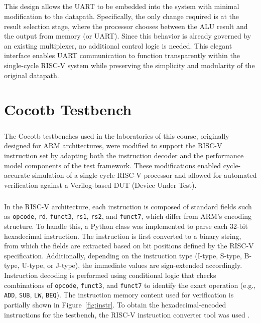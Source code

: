 \documentclass[12pt]{report}
\begin{document}
\paragraph{}
This design allows the UART to be embedded into the system with minimal modification to the datapath. Specifically, the only change required is at the result selection stage, where the processor chooses between the ALU result and the output from memory (or UART). Since this behavior is already governed by an existing multiplexer, no additional control logic is needed. This elegant interface enables UART communication to function transparently within the single-cycle RISC-V system while preserving the simplicity and modularity of the original datapath.


\chapter{Cocotb Testbench}
\paragraph{}
The Cocotb testbenches used in the laboratories of this course, originally designed for ARM architectures, were modified to support the RISC-V instruction set by adapting both the instruction decoder and the performance model components of the test framework. These modifications enabled cycle-accurate simulation of a single-cycle RISC-V processor and allowed for automated verification against a Verilog-based DUT (Device Under Test).

\paragraph{}
In the RISC-V architecture, each instruction is composed of standard fields such as \texttt{opcode}, \texttt{rd}, \texttt{funct3}, \texttt{rs1}, \texttt{rs2}, and \texttt{funct7}, which differ from ARM’s encoding structure. To handle this, a Python class was implemented to parse each 32-bit hexadecimal instruction. The instruction is first converted to a binary string, from which the fields are extracted based on bit positions defined by the RISC-V specification. Additionally, depending on the instruction type (I-type, S-type, B-type, U-type, or J-type), the immediate values are sign-extended accordingly. Instruction decoding is performed using conditional logic that checks combinations of \texttt{opcode}, \texttt{funct3}, and \texttt{funct7} to identify the exact operation (e.g., \texttt{ADD}, \texttt{SUB}, \texttt{LW}, \texttt{BEQ}). The instruction memory content used for verification is partially shown in Figure~\ref{fig:instr}. To obtain the hexadecimal-encoded instructions for the testbench, the RISC-V instruction converter tool was used \cite{rvcodecjs}.
\end{document}
